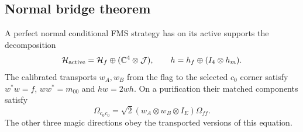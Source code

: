 \subsection{Normal bridge theorem}
\begin{lemma}\label{lem:bridge}
A perfect normal conditional FMS strategy has on its active supports the decomposition
\[
 \mathcal H_{\rm active}=\mathcal H_f\oplus(\mathbb C^4\otimes\mathcal J),
 \qquad h=h_f\oplus(I_4\otimes h_m).
\]
The calibrated transports $w_A,w_B$ from the flag to the selected $c_0$ corner satisfy $w^*w=f$, $ww^*=m_{00}$ and $hw=2wh$. On a purification their matched components satisfy
\begin{equation}\label{eq:bridgevector}
 \Omega_{c_0c_0}=\sqrt2(w_A\otimes w_B\otimes I_E)\Omega_{ff}.
\end{equation}
The other three magic directions obey the transported versions of this equation.
\end{lemma}
